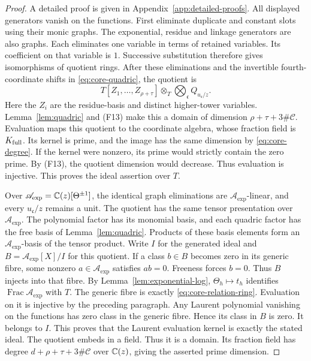 \begin{proof}
A detailed proof is given in Appendix~\ref{app:detailed-proofs}.
All displayed generators vanish on the functions. First eliminate duplicate
and constant slots using their monic graphs. The exponential, residue and linkage generators are also graphs. Each eliminates one variable in terms of retained variables. Its coefficient on that variable is $1$.
Successive substitution therefore gives isomorphisms of quotient rings.
After these eliminations and the invertible fourth-coordinate shifts
in \eqref{eq:core-quadric}, the quotient is
\begin{equation}\label{eq:core-relation-ring}
 T[Z_1,\ldots,Z_{\rho+\tau}]
 \otimes_T\bigotimes_{\mathfrak c}Q_{u_{\mathfrak c}/z}.
\end{equation}
Here the $Z_i$ are the residue-basis and distinct higher-tower variables.
Lemma~\ref{lem:quadric} and (F13) make this a domain of dimension
$\rho+\tau+3\#\mathcal C$.
Evaluation maps this quotient to the coordinate algebra, whose fraction
field is $K_{\rm full}$. Its kernel is prime, and the image has the same
dimension by \eqref{eq:core-degree}. If the kernel were nonzero, its prime would strictly contain the zero prime. By (F13), the quotient dimension would decrease. Thus evaluation is injective. This proves the
ideal assertion over $T$.

Over $\mathscr A_{\exp}=\mathbb{C}(z)[\Theta^{\pm1}]$, the identical graph eliminations are
$\mathscr A_{\exp}$-linear, and every $u_{\mathfrak c}/z$ remains a unit. The quotient
has the same tensor presentation over $\mathscr A_{\exp}$. The polynomial factor has
its monomial basis, and each quadric factor has the free basis of
Lemma~\ref{lem:quadric}. Products of these basis elements form an
$\mathscr A_{\exp}$-basis of the tensor product.
Write $I$ for the generated ideal and
$B=\mathscr A_{\exp}[X]/I$ for this quotient. If a class $b\in B$ becomes
zero in its generic fibre, some nonzero $a\in\mathscr A_{\exp}$ satisfies
$ab=0$. Freeness forces $b=0$. Thus $B$ injects into that fibre.
By Lemma~\ref{lem:exponential-log}, $\Theta_h\mapsto t_h$ identifies
$\operatorname{Frac}\mathscr A_{\exp}$ with $T$. The generic fibre is
exactly \eqref{eq:core-relation-ring}. Evaluation on it is injective by
the preceding paragraph. Any Laurent polynomial vanishing on the functions has zero class in the generic fibre. Hence its class in $B$ is zero. It belongs to $I$. This proves that the Laurent evaluation kernel is
exactly the stated ideal.
The quotient embeds in a field. Thus it is a domain. Its fraction field
has degree $d+\rho+\tau+3\#\mathcal C$ over $\mathbb{C}(z)$, giving the
asserted prime dimension.


\end{proof}
